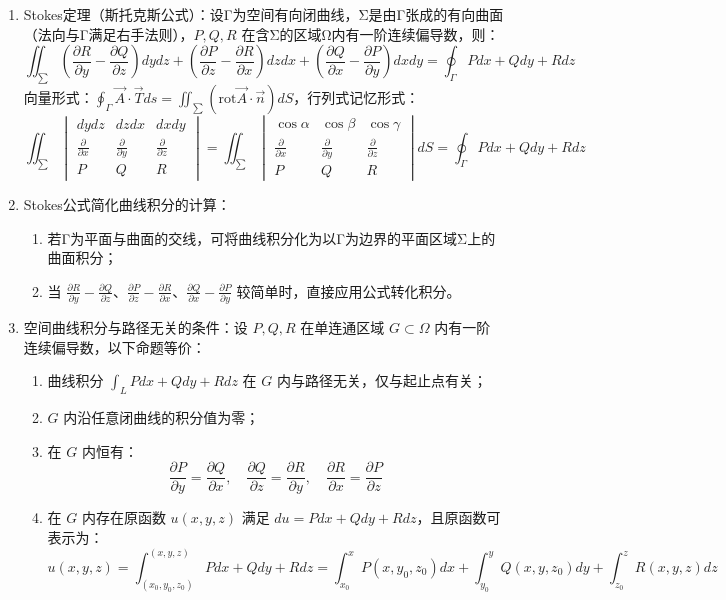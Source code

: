 \documentclass[UTF8]{ctexart}
\theoremstyle{remark}
\begin{document}
\begin{enumerate}
	\item Stokes定理（斯托克斯公式）：设Γ为空间有向闭曲线，Σ是由Γ张成的有向曲面（法向与Γ满足右手法则），\(P, Q, R\) 在含Σ的区域Ω内有一阶连续偏导数，则：
	\[
	\iint_{\sum} \left(\frac{\partial R}{\partial y} - \frac{\partial Q}{\partial z}\right) dydz + \left(\frac{\partial P}{\partial z} - \frac{\partial R}{\partial x}\right) dzdx + \left(\frac{\partial Q}{\partial x} - \frac{\partial P}{\partial y}\right) dxdy = \oint_{\Gamma} P dx + Q dy + R dz
	\]
	向量形式：\(\oint_{\Gamma} \vec{A} \cdot \vec{T} ds = \iint_{\sum} (\text{rot}\vec{A} \cdot \vec{n}) dS\)，行列式记忆形式：
	\[
	\iint_{\sum} \begin{vmatrix} 
		dydz & dzdx & dxdy \\
		\frac{\partial}{\partial x} & \frac{\partial}{\partial y} & \frac{\partial}{\partial z} \\
		P & Q & R 
	\end{vmatrix} = \iint_{\sum} \begin{vmatrix} 
		\cos\alpha & \cos\beta & \cos\gamma \\
		\frac{\partial}{\partial x} & \frac{\partial}{\partial y} & \frac{\partial}{\partial z} \\
		P & Q & R 
	\end{vmatrix} dS = \oint_{\Gamma} P dx + Q dy + R dz
	\]
	
	\item Stokes公式简化曲线积分的计算：
	\begin{enumerate}
		\item 若Γ为平面与曲面的交线，可将曲线积分化为以Γ为边界的平面区域Σ上的曲面积分；
		\item 当 \(\frac{\partial R}{\partial y} - \frac{\partial Q}{\partial z}\)、\(\frac{\partial P}{\partial z} - \frac{\partial R}{\partial x}\)、\(\frac{\partial Q}{\partial x} - \frac{\partial P}{\partial y}\) 较简单时，直接应用公式转化积分。
	\end{enumerate}
	
	\item 空间曲线积分与路径无关的条件：设 \(P, Q, R\) 在单连通区域 \(G \subset \Omega\) 内有一阶连续偏导数，以下命题等价：
	\begin{enumerate}
		\item 曲线积分 \(\int_{L} P dx + Q dy + R dz\) 在 \(G\) 内与路径无关，仅与起止点有关；
		\item \(G\) 内沿任意闭曲线的积分值为零；
		\item 在 \(G\) 内恒有：
		\[
		\frac{\partial P}{\partial y} = \frac{\partial Q}{\partial x}, \quad \frac{\partial Q}{\partial z} = \frac{\partial R}{\partial y}, \quad \frac{\partial R}{\partial x} = \frac{\partial P}{\partial z}
		\]
		\item 在 \(G\) 内存在原函数 \(u(x, y, z)\) 满足 \(du = P dx + Q dy + R dz\)，且原函数可表示为：
		\[
		u(x, y, z) = \int_{(x_0, y_0, z_0)}^{(x, y, z)} P dx + Q dy + R dz = \int_{x_0}^{x} P(x, y_0, z_0) dx + \int_{y_0}^{y} Q(x, y, z_0) dy + \int_{z_0}^{z} R(x, y, z) dz
		\]
	\end{enumerate}
\end{enumerate}
\end{document}
